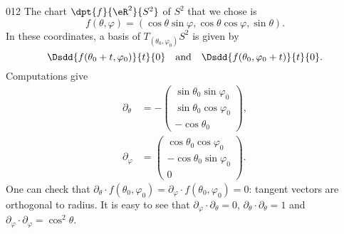 \begin{corrige}{012}
The chart $\dpt{ f }{ \eR^2 }{ S^2 }$ of $S^2$ that we chose is
\[ 
  f(\theta,\varphi)=(\cos\theta\sin\varphi,\cos\theta\cos\varphi,\sin\theta).
\]
In these coordinates, a basis of $T_{(\theta_0,\varphi_0)}S^2$ is given by
\[ 
  \Dsdd{ f(\theta_0+t,\varphi_0) }{t}{0}\quad\text{and}\quad\Dsdd{ f(\theta_0,\varphi_0+t) }{t}{0}.
\]
Computations give
\begin{subequations}
\begin{align}
  \partial_{\theta}&=-
\begin{pmatrix}
\sin\theta_0\sin\varphi_0\\
\sin\theta_0\cos\varphi_0\\
-\cos\theta_0
\end{pmatrix}
,\\
\partial_{\varphi}&=
\begin{pmatrix}
\cos\theta_0\cos\varphi_0\\
-\cos\theta_0\sin\varphi_0\\
0
\end{pmatrix}
.
\end{align}
\end{subequations}
One can check that $\partial_{\theta}\cdot f(\theta_0,\varphi_0)=\partial_{\varphi}\cdot f(\theta_0,\varphi_0)=0$: tangent vectors are orthogonal to radius. It is easy to see that $\partial_{\varphi}\cdot\partial_{\theta}=0$, $\partial_{\theta}\cdot\partial_{\theta}=1$ and $\partial_{\varphi}\cdot\partial_{\varphi}=\cos^2\theta$.

\end{corrige}
